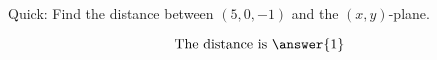 \documentclass{ximera}
\author{Bart Snapp}
\begin{document}
\begin{exercise}
  Quick: Find the distance between $(5,0,-1)$ and the $(x,y)$-plane.
  \begin{prompt}
  \[
  \text{The distance is }\answer{1}
  \]
  \end{prompt}
\end{exercise}
\end{document}
